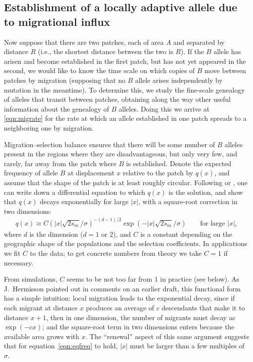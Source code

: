 \documentclass{article}
\newcommand{\linelabel}[1]{}
\newcommand{\revpoint}[2]{}
\newcommand{\citet}[1]{\cite{#1}}
\begin{document}
\subsection[Establishment by Migration]{Establishment of a locally adaptive allele due to migrational influx}
\label{ss:patchymigration}

Now suppose that there are two patches, each of area $A$ and separated by distance $R$
(i.e., the shortest distance between the two is $R$). \revpoint{2}{9}
If the $B$ allele has arisen and become established in the first patch, but has not yet appeared in the second,
we would like to know the time scale on which copies of $B$ move between patches by migration
(supposing that no $B$ allele arises independently by mutation in the meantime).
To determine this, 
we study the fine-scale genealogy of alleles that transit between patches,
obtaining along the way other useful information about the genealogy of $B$ alleles. 
Doing this we arrive at \eqref{eqn:migrate} for the rate at which 
an allele established in one patch spreads to a neighboring one by migration.

Migration--selection balance ensures that 
there will be some number of $B$ alleles present in the regions where they are disadvantageous,
but only very few, and rarely, far away from the patch where $B$ is established.
Denote the expected frequency of allele $B$ at displacement $x$ relative to the patch by $q(x)$,
and assume that the shape of the patch is at least roughly circular.
Following \citet{haldane1948theory} or \citet{slatkin1973geneflow}, one can write down a differential equation to which $q(x)$ is the solution,
and show that $q(x)$ decays exponentially for large $|x|$,
with a square-root correction in two dimensions:
\begin{align} \label{eqn:eqfreq}
  q(x) \approx C \left( |x| \sqrt{2 s_m}/\sigma \right)^{-(d-1)/2} \exp( - |x| \sqrt{2 s_m} / \sigma) \qquad \text{for large $|x|$},
\end{align}
where $d$ is the dimension ($d=1$ or $2$), 
and $C$ is a constant depending on the geographic shape of the populations and the selection coefficients.
In applications we fit $C$ to the data;
to get concrete numbers from theory we take $C=1$ if necessary.

From simulations, $C$ seems to be not too far from 1 in practice (see below).
As J.\ Hermisson pointed out in comments on an earlier draft,
this functional form has a simple intuition:
local migration leads to the exponential decay,
since if each migrant at distance $x$ 
produces an average of $c$ descendants that make it to distance $x+1$, 
then in one dimension, the number of migrants must decay as $\exp(-cx)$;
and the square-root term in two dimensions 
enters because the available area grows with $x$.  
The ``renewal'' aspect of this same argument suggests that for equation~\eqref{eqn:eqfreq} to hold,
$|x|$ must be larger than a few multiples of $\sigma$.
\linelabel{rr:q_form}
\end{document}
